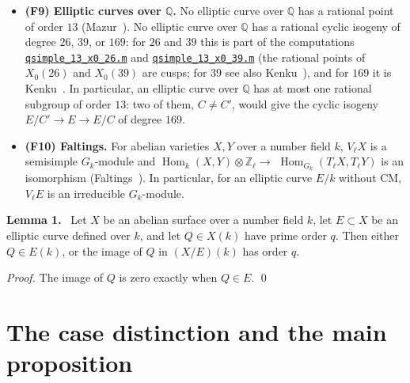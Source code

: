 \documentclass[11pt]{article}
\newenvironment{statement}[1]{\par\medskip\noindent\phantomsection\textbf{#1}\ }{\par\medskip}
\newcommand{\Q}{\mathbb Q}
\newcommand{\Z}{\mathbb Z}
\DeclareMathOperator{\Hom}{Hom}
\begin{document}
\begin{itemize}
          \(E_1\times E_2\) with the product polarization, then \((B,\lambda)\) is not the Jacobian of a
          curve of genus \(2\): the theta divisor of a genus-\(2\) Jacobian is irreducible, while that of
          a product is \(E_1\times\{0\}\cup\{0\}\times E_2\).
\item \textbf{(F9) Elliptic curves over \(\Q\).} No elliptic curve over \(\Q\) has a rational point of
          order \(13\) (Mazur~\cite[Theorem (7\({}'\))]{Maz}). No elliptic curve over \(\Q\) has a rational cyclic
          isogeny of degree \(26\), \(39\), or \(169\): for \(26\) and \(39\) this is part of the computations
          \href{https://genus-2-torsion.github.io/data/knowledge/sources/qsimple_13_x0_26.m}{\texttt{qsimple\_\allowbreak{}13\_\allowbreak{}x0\_\allowbreak{}26.m}} and \href{https://genus-2-torsion.github.io/data/knowledge/sources/qsimple_13_x0_39.m}{\texttt{qsimple\_\allowbreak{}13\_\allowbreak{}x0\_\allowbreak{}39.m}} (the rational points of \(X_0(26)\) and
          \(X_0(39)\) are cusps; for \(39\) see also Kenku~\cite{Ken79}), and for \(169\) it is
          Kenku~\cite{Ken80}. In particular, an elliptic curve over \(\Q\) has at most one rational
          subgroup of order \(13\): two of them, \(C\neq C'\), would give the cyclic isogeny
          \(E/C'\to E\to E/C\) of degree \(169\).
\item \textbf{(F10) Faltings.} For abelian varieties \(X,Y\) over a number field \(k\), \(V_\ell X\) is a
          semisimple \(G_k\)-module and \(\Hom_k(X,Y)\otimes\Z_\ell\to{}\) \(\Hom_{G_k}(T_\ell X,T_\ell Y)\) is an
          isomorphism (Faltings~\cite[§5, Satz 3 and Korollar 1]{Fal}). In particular, for an elliptic
          curve \(E/k\) without CM, \(V_\ell E\) is an irreducible \(G_k\)-module.
\end{itemize}

\begin{statement}{Lemma 1.}\label{lemma-sequence}
Let \(X\) be an abelian surface over a number field \(k\), let \(E\subset X\) be an elliptic curve
          defined over \(k\), and let \(Q\in X(k)\) have prime order \(q\). Then either \(Q\in E(k)\), or the
          image of \(Q\) in \((X/E)(k)\) has order \(q\).
\end{statement}

\emph{Proof.} The image of \(Q\) is zero exactly when \(Q\in E\). \qed

\section{The case distinction and the main proposition}\label{cases}
\end{document}
